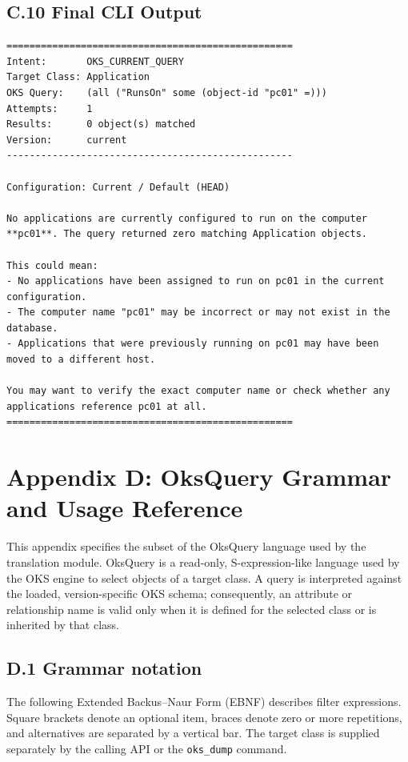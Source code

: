 \documentclass[12pt, a4paper]{report}
\begin{document}
\clearpage
\subsection*{C.10 Final CLI Output}
\begin{lstlisting}
==================================================
Intent:       OKS_CURRENT_QUERY
Target Class: Application
OKS Query:    (all ("RunsOn" some (object-id "pc01" =)))
Attempts:     1
Results:      0 object(s) matched
Version:      current
--------------------------------------------------

Configuration: Current / Default (HEAD)

No applications are currently configured to run on the computer **pc01**. The query returned zero matching Application objects.

This could mean:
- No applications have been assigned to run on pc01 in the current configuration.
- The computer name "pc01" may be incorrect or may not exist in the database.
- Applications that were previously running on pc01 may have been moved to a different host.

You may want to verify the exact computer name or check whether any applications reference pc01 at all.
==================================================
\end{lstlisting}
\clearpage
\section*{Appendix D: OksQuery Grammar and Usage Reference}

This appendix specifies the subset of the OksQuery language used by the
translation module. OksQuery is a read-only, S-expression-like language used
by the OKS engine to select objects of a target class. A query is interpreted
against the loaded, version-specific OKS schema; consequently, an attribute or
relationship name is valid only when it is defined for the selected class or
is inherited by that class.

\subsection*{D.1 Grammar notation}
The following Extended Backus--Naur Form (EBNF) describes filter expressions.
Square brackets denote an optional item, braces denote zero or more
repetitions, and alternatives are separated by a vertical bar. The target
class is supplied separately by the calling API or the \texttt{oks\_dump}
command.
\end{document}
